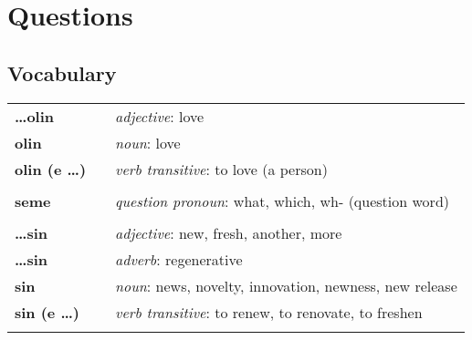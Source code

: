 \section{Questions}
\subsection*{Vocabulary}
%
\begin{supertabular}{p{2,5cm}|ll}
    \textbf{\dots olin}     &  & \textit{adjective}: love                                                      \\ %
    \textbf{olin}           &  & \textit{noun}: love                                                           \\ %
    \textbf{olin (e \dots)} &  & \textit{verb transitive}: to love (a person)                                  \\ %
                            &  &                                                                               \\ %
    \textbf{seme}           &  & \textit{question pronoun}: what, which, wh- (question word)                   \\ %
                            &  &                                                                               \\ %
    \textbf{\dots sin}      &  & \textit{adjective}: new, fresh, another, more                                 \\ %
    \textbf{ \dots sin }    &  & \textit{adverb}: regenerative                                                 \\ %
    \textbf{sin}            &  & \textit{noun}: news, novelty, innovation, newness, new release                \\ %
    \textbf{sin (e \dots)}  &  & \textit{verb transitive}: to renew, to renovate, to freshen                   \\ %
                            &  &                                                                               \\ %

\end{supertabular}
